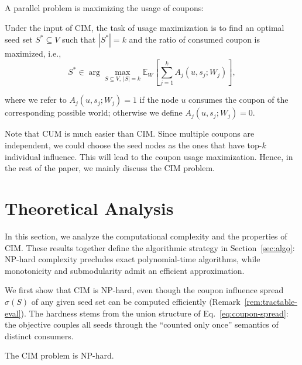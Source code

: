 \documentclass[sigconf]{acmart}
\begin{document}
A parallel problem is maximizing the usage of coupons:
\begin{definition}
\label{def:cum}
Under the input of CIM,
the task of usage maximization is to find an
optimal seed set $S^*\subseteq V$ such that $|S^*|=k$ and the ratio of consumed coupon
 is maximized, i.e.,
\begin{equation}
\label{eq:cum}
S^*
\in
\arg\max_{S\subseteq V,\ |S|=k}
\mathbb{E}_{W}[\sum_{j=1}^{k} A_j(u,s_j;W_j)],
\end{equation}
\end{definition}
where we refer to $A_j(u,s_j;W_j)=1$ if the node $u$ consumes the coupon of the corresponding possible world; otherwise we define $A_j(u,s_j;W_j)=0$.

Note that CUM is much easier than CIM. Since multiple coupons are independent, we could choose the seed nodes as the ones that have top-$k$ individual influence. This will lead to the coupon usage maximization. Hence, in the rest of the paper, we mainly discuss the CIM problem.



\section{Theoretical Analysis}
\label{sec:theory}

In this section, we analyze the computational complexity and the
properties of CIM.
These results together define the algorithmic strategy in
Section~\ref{sec:algo}: NP-hard complexity precludes exact polynomial-time
algorithms, while monotonicity and submodularity admit an efficient
approximation.

We first show that CIM is NP-hard, even though the coupon influence
spread $\sigma(S)$ of any given seed set can be computed efficiently
(Remark~\ref{rem:tractable-eval}).
The hardness stems from the union structure of
Eq.~\eqref{eq:coupon-spread}: the objective couples all seeds through
the ``counted only once'' semantics of distinct consumers.

\begin{theorem}
\label{thm:nphard}
The CIM problem is NP-hard.
\end{theorem}
\end{document}

